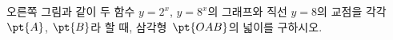\noindent\begin{minipage}[t]{0.58\linewidth}\vspace{0pt}\raggedright 오른쪽 그림과 같이 두 함수 $y=2^{x}$, $y=8^{x}$의 그래프와 직선 $y=8$의 교점을 각각 $\pt{A}$, $\pt{B}$라 할 때, 삼각형~$\pt{OAB}$의 넓이를 구하시오. \end{minipage}\hfill\begin{minipage}[t]{0.4\linewidth}\vspace{0pt}\centering \resizebox{\ifdim\width>\linewidth\linewidth\else\width\fi}{!}{}\end{minipage}\par
